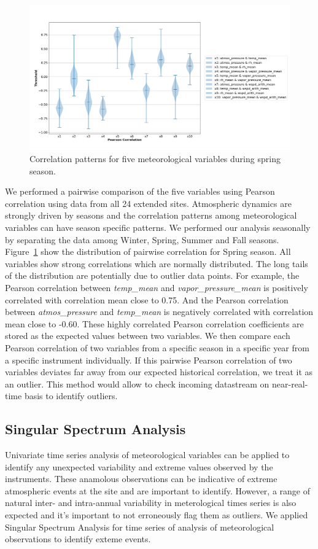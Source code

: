 \begin{figure}[ht]
    \centering
    \includegraphics[width=\textwidth]{figures/Spring.png}
    \caption{Correlation patterns for five meteorological variables
		during spring season.}
    \label{fig:pc}
\end{figure}

We performed a pairwise comparison of the five variables using Pearson
correlation using data from all 24 extended sites. Atmospheric
dynamics are strongly driven by seasons and the correlation patterns
among meteorological variables can have season specific patterns. We
performed our analysis seasonally by separating the data among Winter, Spring,
Summer and Fall seasons. Figure~\ref{fig:pc} show the distribution of
pairwise correlation for Spring season. All variables show strong
correlations which are normally distributed. The long tails of the
distribution are potentially due to outlier data points. 
For example, the Pearson correlation between
\textit{temp\_mean} and \textit{vapor\_pressure\_mean} is positively
correlated with correlation mean close to 0.75. And the Pearson
correlation between \textit{atmos\_pressure} and \textit{temp\_mean} is
negatively correlated with correlation mean close to -0.60. These highly
correlated Pearson correlation coefficients are stored as the expected
values between two variables. We then compare each Pearson correlation
of two variables from a specific season in a specific year from a
specific instrument individually. If this pairwise Pearson correlation
of two variables deviates far away from our expected historical
correlation, we treat it as an outlier. This method would allow to check
incoming datastream on near-real-time basis to identify outliers.

\subsection{Singular Spectrum Analysis}
Univariate time series analysis of meteorological variables can be
applied to identify any unexpected variability and extreme values
observed by the instruments. These anamolous observations can be
indicative of extreme atmospheric events at the site and are important
to identify. However, a range of natural inter- and intra-annual variability in
meterological times series is also expected and it's important to not
erroneously flag them as outliers. We applied Singular Spectrum Analysis
for time series of analysis of meteorological observations to identify
exteme events.

